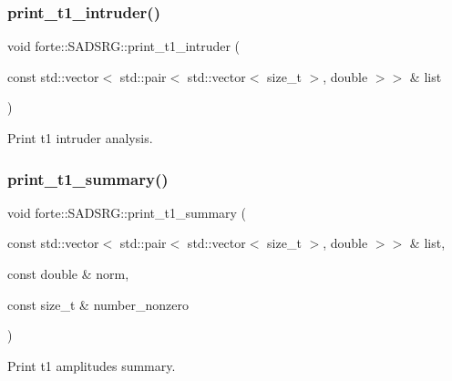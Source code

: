 \subsubsection{\texorpdfstring{print\+\_\+t1\+\_\+intruder()}{print\_t1\_intruder()}}
{\footnotesize\ttfamily void forte\+::\+S\+A\+D\+S\+R\+G\+::print\+\_\+t1\+\_\+intruder (\begin{DoxyParamCaption}\item[{const std\+::vector$<$ std\+::pair$<$ std\+::vector$<$ size\+\_\+t $>$, double $>$$>$ \&}]{list }\end{DoxyParamCaption})\hspace{0.3cm}{\ttfamily [protected]}}



Print t1 intruder analysis. 

\mbox{\label{classforte_1_1_s_a_d_s_r_g_aa48af6f1422a5b7649dc0d8c8cbf7eb5}} 
\subsubsection{\texorpdfstring{print\+\_\+t1\+\_\+summary()}{print\_t1\_summary()}}
{\footnotesize\ttfamily void forte\+::\+S\+A\+D\+S\+R\+G\+::print\+\_\+t1\+\_\+summary (\begin{DoxyParamCaption}\item[{const std\+::vector$<$ std\+::pair$<$ std\+::vector$<$ size\+\_\+t $>$, double $>$$>$ \&}]{list,  }\item[{const double \&}]{norm,  }\item[{const size\+\_\+t \&}]{number\+\_\+nonzero }\end{DoxyParamCaption})\hspace{0.3cm}{\ttfamily [protected]}}



Print t1 amplitudes summary. 

\mbox{\label{classforte_1_1_s_a_d_s_r_g_afd3fc7f2d4cd529d151cb293f4b322df}} 

